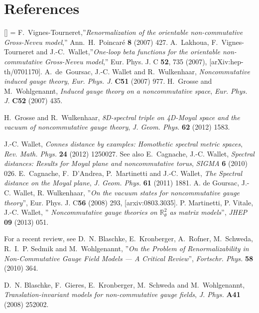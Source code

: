 \documentclass[a4paper,11pt]{article}
\numberwithin{equation}{section}
\renewenvironment{thebibliography}[1]
         {\section*{References}\frenchspacing\small
          \begin{list}{[\arabic{enumi}]}
         {\usecounter{enumi}\parsep=2pt\topsep 0pt
         \settowidth{\labelwidth}{[#1]}
         \leftmargin=\labelwidth\advance\leftmargin\labelsep
         \rightmargin=0pt\itemsep=1pt\sloppy}}{\end{list}}
\theoremstyle{nonumberplain}
\begin{document}
\begin{thebibliography}{50}
 F.~Vignes-Tourneret,''{\it{Renormalization of the orientable non-commutative Gross-Neveu model}},''  Ann.\ H.\ Poincar\'e {\bf{8}} (2007) 427. 
A.~Lakhoua, F.~Vignes-Tourneret and J.-C.~Wallet,''{\it{One-loop beta functions for the orientable non-commutative Gross-Neveu
 model}},'' Eur. Phys. J. C {\bf{52}}, 735 (2007), [arXiv:hep-th/0701170]. 
A.~de~Goursac, J.-C. Wallet and R.~Wulkenhaar, \textit{Noncommutative induced
  gauge theory}, \textit{Eur. Phys. J.} \textbf{C51} (2007) 977.
  H.~Grosse and M.~Wohlgenannt, \textit{Induced gauge theory on a noncommutative
  space}, \textit{Eur. Phys. J.} \textbf{C52} (2007) 435.

H.~Grosse and R.~Wulkenhaar, \textit{{8D-spectral triple on 4D-Moyal space and
  the vacuum of noncommutative gauge theory}}, \textit{J. Geom. Phys.}
  \textbf{62} (2012) 1583.

J.-C. Wallet, \textit{{Connes distance by examples: Homothetic spectral metric
  spaces}}, \textit{Rev. Math. Phys.} \textbf{24} (2012) 1250027.
  See also E.~Cagnache, J.-C. Wallet, \textit{{Spectral distances: Results
  for Moyal plane and noncommutative torus}}, \textit{SIGMA} \textbf{6} (2010)
  026.
  E.~Cagnache, F.~D'Andrea, P.~Martinetti and J.-C. Wallet, \textit{{The Spectral
  distance on the Moyal plane}}, \textit{J. Geom. Phys.} \textbf{61} (2011)
  1881.
 A. de Goursac, J.-C. Wallet, R. Wulkenhaar, ''{\it{On the vacuum states for noncommutative gauge theory}}'', Eur. Phys. J. C{\bf{56}} (2008) 293, [arxiv:0803.3035]. 
 P. Martinetti, P. Vitale, J.-C. Wallet, ''{\it{ Noncommutative gauge theories on $\mathbb{R}^2_\theta$ as matrix models}}'', \textit{JHEP} \textbf{09} (2013) 051.

For a recent review, see D.~N. Blaschke, E.~Kronberger, A.~Rofner, M.~Schweda, R.~I.~P. Sedmik and
  M.~Wohlgenannt, ''\textit{{On the Problem of Renormalizability in
  Non-Commutative Gauge Field Models --- A Critical Review}}'', \textit{Fortschr.
  Phys.} \textbf{58} (2010) 364.

D.~N. Blaschke, F.~Gieres, E.~Kronberger, M.~Schweda and M.~Wohlgenannt,
  \textit{{Translation-invariant models for non-commutative gauge fields}},
  \textit{J. Phys.} \textbf{A41} (2008) 252002.


\end{thebibliography}
\end{document}
